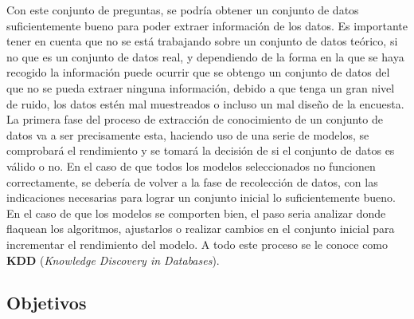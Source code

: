 Con este conjunto de preguntas, se podría obtener un conjunto de datos suficientemente bueno para poder extraer información de los datos. Es importante tener en cuenta que no se está trabajando sobre un conjunto de datos teórico, si no que es un conjunto de datos real, y dependiendo de la forma en la que se haya recogido la información puede ocurrir que se obtengo un conjunto de datos del que no se pueda extraer ninguna información, debido a que tenga un gran nivel de ruido, los datos estén mal muestreados o incluso un mal diseño de la encuesta.\\
\linebreak
La primera fase del proceso de extracción de conocimiento de un conjunto de datos va a ser precisamente esta, haciendo uso de una serie de modelos, se comprobará el rendimiento y se tomará la decisión de si el conjunto de datos es válido o no. En el caso de que todos los modelos seleccionados no funcionen correctamente, se debería de volver a la fase de recolección de datos, con las indicaciones necesarias para lograr un conjunto inicial lo suficientemente bueno. \\
\linebreak
En el caso de que los modelos se comporten bien, el paso seria analizar donde flaquean los algoritmos,  ajustarlos o realizar cambios en el conjunto inicial para incrementar el rendimiento del modelo. A todo este proceso se le conoce como \textbf{KDD} (\textit{Knowledge Discovery in Databases}).
\subsection{Objetivos}
\label{sec:obj}